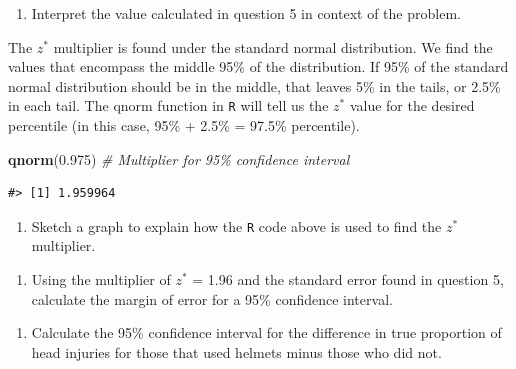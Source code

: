 \documentclass[
]{report}
\newenvironment{Shaded}{\begin{snugshade}}{\end{snugshade}}
\newcommand{\CommentTok}[1]{\textcolor[rgb]{0.56,0.35,0.01}{\textit{#1}}}
\newcommand{\FloatTok}[1]{\textcolor[rgb]{0.00,0.00,0.81}{#1}}
\newcommand{\KeywordTok}[1]{\textcolor[rgb]{0.13,0.29,0.53}{\textbf{#1}}}
\newcommand{\NormalTok}[1]{#1}
\providecommand{\tightlist}{%
  \setlength{\itemsep}{0pt}\setlength{\parskip}{0pt}}
\begin{document}
\vspace{1in}

\begin{enumerate}
\def\labelenumi{\arabic{enumi}.}
\setcounter{enumi}{5}
\tightlist
\item
  Interpret the value calculated in question 5 in context of the problem.
\end{enumerate}

\vspace{1in}

The \(z^*\) multiplier is found under the standard normal distribution. We find the values that encompass the middle 95\% of the distribution. If 95\% of the standard normal distribution should be in the middle, that leaves 5\% in the tails, or 2.5\% in each tail. The qnorm function in \texttt{R} will tell us the \(z^*\) value for the desired percentile (in this case, 95\% + 2.5\% = 97.5\% percentile).

\begin{Shaded}
\begin{Highlighting}[]
\KeywordTok{qnorm}\NormalTok{(}\FloatTok{0.975}\NormalTok{) }\CommentTok{\# Multiplier for 95\% confidence interval}
\end{Highlighting}
\end{Shaded}

\begin{verbatim}
#> [1] 1.959964
\end{verbatim}

\begin{enumerate}
\def\labelenumi{\arabic{enumi}.}
\setcounter{enumi}{6}
\tightlist
\item
  Sketch a graph to explain how the \texttt{R} code above is used to find the \(z^*\) multiplier.
\end{enumerate}

\vspace{1.5in}

\begin{enumerate}
\def\labelenumi{\arabic{enumi}.}
\setcounter{enumi}{7}
\tightlist
\item
  Using the multiplier of \(z^*\) = 1.96 and the standard error found in question 5, calculate the margin of error for a 95\% confidence interval.
\end{enumerate}

\vspace{0.5in}

\begin{enumerate}
\def\labelenumi{\arabic{enumi}.}
\setcounter{enumi}{8}
\tightlist
\item
  Calculate the 95\% confidence interval for the difference in true proportion of head injuries for those that used helmets minus those who did not.
\end{enumerate}
\end{document}

